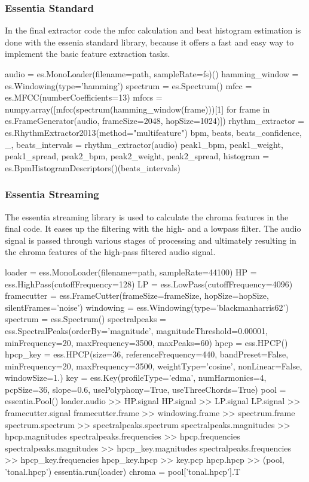 \subsubsection{Essentia Standard}

In the final extractor code the mfcc calculation and beat histogram estimation is done with the essenia standard library, because it offers a fast and easy way to implement the basic feature extraction tasks. 
\begin{pythonCode}[frame=single,label={lst:esss},caption={essentia standard},captionpos=b]
audio = es.MonoLoader(filename=path, sampleRate=fs)()
hamming_window = es.Windowing(type='hamming')
spectrum = es.Spectrum()
mfcc = es.MFCC(numberCoefficients=13)
mfccs = numpy.array([mfcc(spectrum(hamming_window(frame)))[1] 
	for frame in es.FrameGenerator(audio, frameSize=2048, hopSize=1024)])
rhythm_extractor = es.RhythmExtractor2013(method="multifeature")
bpm, beats, beats_confidence, _, beats_intervals = rhythm_extractor(audio)
peak1_bpm, peak1_weight, peak1_spread, peak2_bpm, peak2_weight, peak2_spread, histogram =
	es.BpmHistogramDescriptors()(beats_intervals)
\end{pythonCode}

\subsubsection{Essentia Streaming}

The essentia streaming library is used to calculate the chroma features in the final code. It eases up the filtering with the high- and a lowpass filter. The audio signal is passed through various stages of processing and ultimately resulting in the chroma features of the high-pass filtered audio signal. 
\begin{pythonCode}[frame=single,label={lst:essst},caption={essentia streaming},captionpos=b]
loader = ess.MonoLoader(filename=path, sampleRate=44100)
HP = ess.HighPass(cutoffFrequency=128)
LP = ess.LowPass(cutoffFrequency=4096)
framecutter = ess.FrameCutter(frameSize=frameSize, hopSize=hopSize, 
	silentFrames='noise')
windowing = ess.Windowing(type='blackmanharris62')
spectrum = ess.Spectrum()
spectralpeaks = ess.SpectralPeaks(orderBy='magnitude', magnitudeThreshold=0.00001, 
	minFrequency=20, maxFrequency=3500, maxPeaks=60)
hpcp = ess.HPCP()
hpcp_key = ess.HPCP(size=36, referenceFrequency=440, bandPreset=False, minFrequency=20,
	maxFrequency=3500, weightType='cosine', nonLinear=False, windowSize=1.)
key = ess.Key(profileType='edma', numHarmonics=4, pcpSize=36, slope=0.6, 
	usePolyphony=True, useThreeChords=True)
pool = essentia.Pool()
loader.audio >> HP.signal
HP.signal >> LP.signal
LP.signal >> framecutter.signal    
framecutter.frame >> windowing.frame >> spectrum.frame
spectrum.spectrum >> spectralpeaks.spectrum
spectralpeaks.magnitudes >> hpcp.magnitudes
spectralpeaks.frequencies >> hpcp.frequencies
spectralpeaks.magnitudes >> hpcp_key.magnitudes
spectralpeaks.frequencies >> hpcp_key.frequencies
hpcp_key.hpcp >> key.pcp
hpcp.hpcp >> (pool, 'tonal.hpcp')
essentia.run(loader)
chroma = pool['tonal.hpcp'].T
\end{pythonCode}	

